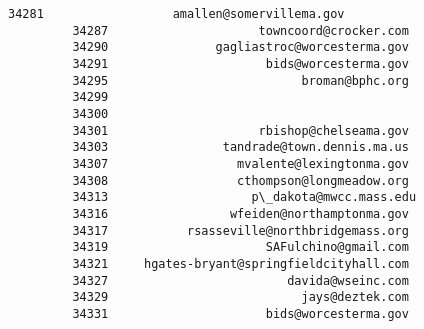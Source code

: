 \documentclass[11pt]{article}
\begin{document}
\begin{Verbatim}[commandchars=\\\{\}]
         34281                  amallen@somervillema.gov   
         34287                     towncoord@crocker.com   
         34290               gagliastroc@worcesterma.gov   
         34291                      bids@worcesterma.gov   
         34295                           broman@bphc.org   
         34299                                             
         34300                                             
         34301                     rbishop@chelseama.gov   
         34303                tandrade@town.dennis.ma.us   
         34307                  mvalente@lexingtonma.gov   
         34308                  cthompson@longmeadow.org   
         34313                    p\_dakota@mwcc.mass.edu   
         34316                 wfeiden@northamptonma.gov   
         34317           rsasseville@northbridgemass.org   
         34319                      SAFulchino@gmail.com   
         34321     hgates-bryant@springfieldcityhall.com   
         34327                         davida@wseinc.com   
         34329                           jays@deztek.com   
         34331                      bids@worcesterma.gov   
         

\end{Verbatim}
\end{document}
